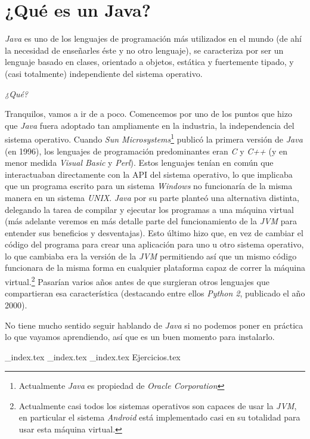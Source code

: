 \chapter{¿Qué es un Java?}
  \label{ch:java}
  \textit{Java} es uno de los lenguajes de programación más utilizados en el mundo (de ahí la 
  necesidad de enseñarles éste y no otro lenguaje), se caracteriza por ser un lenguaje basado en 
  clases, orientado a objetos, estática y fuertemente tipado, y (casi totalmente) independiente del sistema 
  operativo.
  
  \begin{center}
    \textit{¿Qué?}
  \end{center}

  Tranquilos, vamos a ir de a poco.
  Comencemos por uno de los puntos que hizo que \textit{Java} fuera adoptado tan ampliamente en la
  industria, la independencia del sistema operativo.
  Cuando \textit{Sun Microsystems}\footnote{Actualmente \textit{Java} es propiedad de 
  \textit{Oracle Corporation}} publicó la primera versión de \textit{Java} (en 1996), los 
  lenguajes de programación predominantes eran \textit{C} y \textit{C++} (y en menor medida 
  \textit{Visual Basic} y \textit{Perl}).
  Estos lenguajes tenían en común que interactuaban directamente con la API del sistema operativo,
  lo que implicaba que un programa escrito para un sistema \textit{Windows} no funcionaría de la
  misma manera en un sistema \textit{UNIX}.
  \textit{Java} por su parte planteó una alternativa distinta, delegando la tarea de compilar y 
  ejecutar los programas a una máquina virtual (más adelante veremos en más detalle parte del 
  funcionamiento de la \textit{JVM} para entender sus beneficios y desventajas).
  Esto último hizo que, en vez de cambiar el código del programa para crear una aplicación para 
  uno u otro sistema operativo, lo que cambiaba era la versión de la \textit{JVM} permitiendo así
  que un mismo código funcionara de la misma forma en cualquier plataforma capaz de correr la 
  máquina virtual.\footnote{Actualmente casi todos los sistemas operativos son capaces de usar la 
  \textit{JVM}, en particular el sistema \textit{Android} está implementado casi en su totalidad 
  para usar esta máquina virtual.}
  Pasarían varios años antes de que surgieran otros lenguajes que compartieran esa característica
  (destacando entre ellos \textit{Python 2}, publicado el año 2000).

  No tiene mucho sentido seguir hablando de \textit{Java} si no podemos poner en práctica lo que 
  vayamos aprendiendo, así que es un buen momento para instalarlo.
  
  {_index.tex}
  {_index.tex}
  {_index.tex}
  {Ejercicios.tex}

\printbibliography[keyword=java]